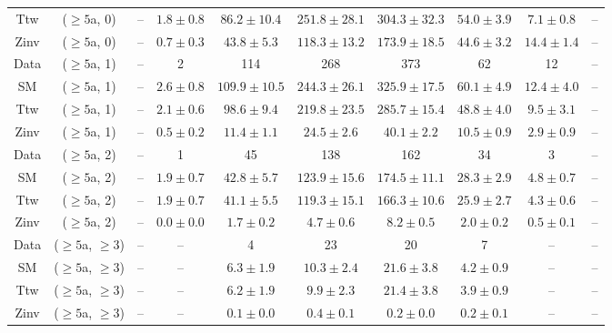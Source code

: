 \begin{table}[h!]
{\begin{tabular}{cccccccccc}
	Ttw & ($\ge5$a, 0) & -- & $1.8\pm 0.8$ & $86.2\pm 10.4$ & $251.8\pm 28.1$ & $304.3\pm 32.3$ & $54.0\pm 3.9$ & $7.1\pm 0.8$ & -- \\[0.5ex] 
	Zinv & ($\ge5$a, 0) & -- & $0.7\pm 0.3$ & $43.8\pm 5.3$ & $118.3\pm 13.2$ & $173.9\pm 18.5$ & $44.6\pm 3.2$ & $14.4\pm 1.4$ & -- \\[0.5ex] 
	Data & ($\ge5$a, 1) & -- & 2 & 114 & 268 & 373 & 62 & 12 & -- \\[0.5ex] 
	SM & ($\ge5$a, 1) & -- & $2.6\pm 0.8$ & $109.9\pm 10.5$ & $244.3\pm 26.1$ & $325.9\pm 17.5$ & $60.1\pm 4.9$ & $12.4\pm 4.0$ & -- \\[0.5ex] 
	Ttw & ($\ge5$a, 1) & -- & $2.1\pm 0.6$ & $98.6\pm 9.4$ & $219.8\pm 23.5$ & $285.7\pm 15.4$ & $48.8\pm 4.0$ & $9.5\pm 3.1$ & -- \\[0.5ex] 
	Zinv & ($\ge5$a, 1) & -- & $0.5\pm 0.2$ & $11.4\pm 1.1$ & $24.5\pm 2.6$ & $40.1\pm 2.2$ & $10.5\pm 0.9$ & $2.9\pm 0.9$ & -- \\[0.5ex] 
	Data & ($\ge5$a, 2) & -- & 1 & 45 & 138 & 162 & 34 & 3 & -- \\[0.5ex] 
	SM & ($\ge5$a, 2) & -- & $1.9\pm 0.7$ & $42.8\pm 5.7$ & $123.9\pm 15.6$ & $174.5\pm 11.1$ & $28.3\pm 2.9$ & $4.8\pm 0.7$ & -- \\[0.5ex] 
	Ttw & ($\ge5$a, 2) & -- & $1.9\pm 0.7$ & $41.1\pm 5.5$ & $119.3\pm 15.1$ & $166.3\pm 10.6$ & $25.9\pm 2.7$ & $4.3\pm 0.6$ & -- \\[0.5ex] 
	Zinv & ($\ge5$a, 2) & -- & $0.0\pm 0.0$ & $1.7\pm 0.2$ & $4.7\pm 0.6$ & $8.2\pm 0.5$ & $2.0\pm 0.2$ & $0.5\pm 0.1$ & -- \\[0.5ex] 
	Data & ($\ge5$a, $\ge3$) & -- & -- & 4 & 23 & 20 & 7 & -- & -- \\[0.5ex] 
	SM & ($\ge5$a, $\ge3$) & -- & -- & $6.3\pm 1.9$ & $10.3\pm 2.4$ & $21.6\pm 3.8$ & $4.2\pm 0.9$ & -- & -- \\[0.5ex] 
	Ttw & ($\ge5$a, $\ge3$) & -- & -- & $6.2\pm 1.9$ & $9.9\pm 2.3$ & $21.4\pm 3.8$ & $3.9\pm 0.9$ & -- & -- \\[0.5ex] 
	Zinv & ($\ge5$a, $\ge3$) & -- & -- & $0.1\pm 0.0$ & $0.4\pm 0.1$ & $0.2\pm 0.0$ & $0.2\pm 0.1$ & -- & -- \\[0.5ex] 
	\hline
	\hline
\end{tabular}}
\end{table}
